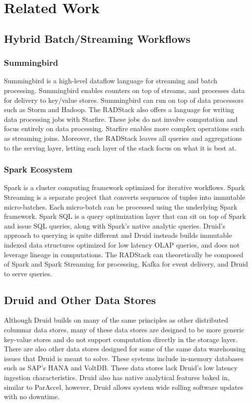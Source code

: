 \documentclass{vldb}
\begin{document}
\section{Related Work}
\label{sec:related}

\subsection{Hybrid Batch/Streaming Workflows}

\subsubsection{Summingbird}
Summingbird\cite{boykin2014summingbird} is a high-level dataflow language for
streaming and batch processing. Summingbird enables counters on top of streams,
and processes data for delivery to key/value stores. Summingbird can run on top
of data processors such as Storm\cite{marz2013storm} and Hadoop. The RADStack
also offers a language for writing data processing jobs with Starfire. These
jobs do not involve computation and focus entirely on data processing. Starfire
enables more complex operations such as streaming joins. Moreover, the RADStack
leaves all queries and aggregations to the serving layer, letting each layer of
the stack focus on what it is best at.

\subsubsection{Spark Ecosystem}
Spark\cite{zaharia2012resilient} is a cluster computing framework optimized for
iterative workflows.  Spark Streaming is a separate project that converts
sequences of tuples into immutable micro-batches. Each micro-batch can be
processed using the underlying Spark framework. Spark SQL is a query
optimization layer that can sit on top of Spark and issue SQL queries, along
with Spark’s native analytic queries.  Druid’s approach to querying is quite
different and Druid insteads builds immutable indexed data structures optimized
for low latency OLAP queries, and does not leverage lineage in computations.
The RADStack can theoretically be composed of Spark and Spark Streaming for
processing, Kafka for event delivery, and Druid to serve queries.

\subsection{Druid and Other Data Stores}
Although Druid builds on many of the same principles as other distributed
columnar data stores\cite{fink2012distributed}, many of these data stores are
designed to be more generic key-value stores\cite{lakshman2010cassandra} and do
not support computation directly in the storage layer. There are also other
data stores designed for some of the same data warehousing issues that Druid is
meant to solve. These systems include in-memory databases such as SAP’s
HANA\cite{farber2012sap} and VoltDB\cite{voltdb2010voltdb}. These data stores
lack Druid’s low latency ingestion characteristics. Druid also has native
analytical features baked in, similar to ParAccel\cite{paraccel2013}, however,
Druid allows system wide rolling software updates with no downtime. 
\end{document}
